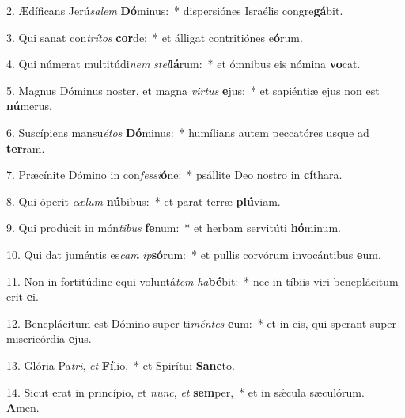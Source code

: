 2. Ædíficans Jerú\textit{sa}\textit{lem} \textbf{Dó}minus:~*  dispersiónes Israélis congre\textbf{gá}bit.\

3. Qui sanat con\textit{trí}\textit{tos} \textbf{cor}de:~*  et álligat contritiónes e\textbf{ó}rum.\

4. Qui númerat multitúdi\textit{nem} \textit{stel}\textbf{lá}rum:~*  et ómnibus eis nómina \textbf{vo}cat.\

5. Magnus Dóminus noster, et magna \textit{vir}\textit{tus} \textbf{e}jus:~*  et sapiéntiæ ejus non est \textbf{nú}merus.\

6. Suscípiens mansu\textit{é}\textit{tos} \textbf{Dó}minus:~*  humílians autem peccatóres usque ad \textbf{ter}ram.\

7. Præcínite Dómino in con\textit{fes}\textit{si}\textbf{ó}ne:~*  psállite Deo nostro in \textbf{cí}thara.\

8. Qui óperit \textit{cæ}\textit{lum} \textbf{nú}bibus:~*  et parat terræ \textbf{plú}viam.\

9. Qui prodúcit in món\textit{ti}\textit{bus} \textbf{fe}num:~*  et herbam servitúti \textbf{hó}minum.\

10. Qui dat juméntis es\textit{cam} \textit{ip}\textbf{só}rum:~*  et pullis corvórum invocántibus \textbf{e}um.\

11. Non in fortitúdine equi voluntá\textit{tem} \textit{ha}\textbf{bé}bit:~*  nec in tíbiis viri beneplácitum erit \textbf{e}i.\

12. Beneplácitum est Dómino super ti\textit{mén}\textit{tes} \textbf{e}um:~*  et in eis, qui sperant super misericórdia \textbf{e}jus.\

13. Glória Pa\textit{tri}, \textit{et} \textbf{Fí}lio,~*  et Spirítui \textbf{Sanc}to.\

14. Sicut erat in princípio, et \textit{nunc}, \textit{et} \textbf{sem}per,~*  et in sǽcula sæculórum. \textbf{A}men.\

